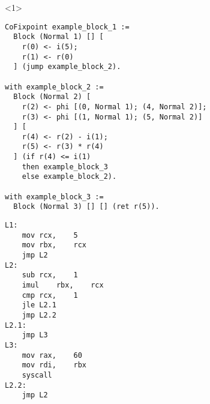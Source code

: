 
\begin{onlyenv}<1>
\begin{minipage}{0.58\linewidth}
\begin{lstlisting}[style=Rocq, basicstyle=\footnotesize\ttfamily]
CoFixpoint example_block_1 :=
  Block (Normal 1) [] [
    r(0) <- i(5);
    r(1) <- r(0)
  ] (jump example_block_2).

with example_block_2 :=
  Block (Normal 2) [
    r(2) <- phi [(0, Normal 1); (4, Normal 2)];
    r(3) <- phi [(1, Normal 1); (5, Normal 2)]
  ] [
    r(4) <- r(2) - i(1);
    r(5) <- r(3) * r(4)
  ] (if r(4) <= i(1)
    then example_block_3
    else example_block_2).

with example_block_3 :=
  Block (Normal 3) [] [] (ret r(5)).
\end{lstlisting}
\end{minipage}
\hfill
\begin{minipage}{0.38\linewidth}
\begin{lstlisting}[style=NASM, basicstyle=\footnotesize\ttfamily]
L1:
	mov	rcx,	5
	mov	rbx,	rcx
	jmp	L2
L2:
	sub	rcx,	1
	imul	rbx,	rcx
	cmp	rcx,	1
	jle	L2.1
	jmp	L2.2
L2.1:
	jmp	L3
L3:
	mov	rax,	60
	mov	rdi,	rbx
	syscall	
L2.2:
	jmp	L2
\end{lstlisting}
\end{minipage}
\end{onlyenv}




